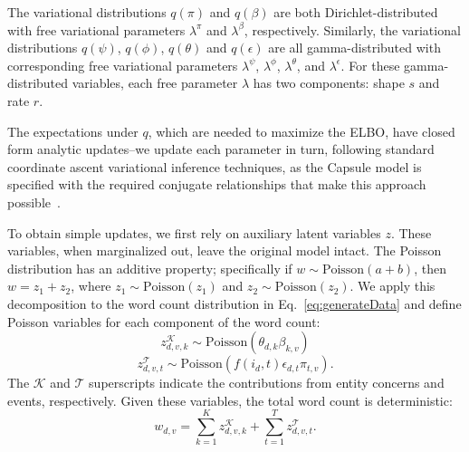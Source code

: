 The variational distributions $q(\pi)$ and $q(\beta)$ are both Dirichlet-distributed with free variational parameters $\lambda^\pi$ and $\lambda^\beta$, respectively.  Similarly, the variational distributions $q(\psi)$, $q(\phi)$, $q(\theta)$ and $q(\epsilon)$ are all gamma-distributed with corresponding free variational parameters $\lambda^\psi$, $\lambda^\phi$, $\lambda^\theta$, and $\lambda^\epsilon$.  For these gamma-distributed variables, each free parameter $\lambda$ has two components: shape $s$ and rate $r$.

The expectations under $q$, which are needed to maximize the ELBO, have closed form analytic updates--we update each parameter in turn, following standard coordinate ascent variational inference techniques, as the Capsule model is specified with the required conjugate relationships that make this approach possible~\cite{Ghahramani:2001}.

To obtain simple updates, we first rely on auxiliary latent variables $z$. These variables, when marginalized out, leave the original model intact. The Poisson distribution has an additive property; specifically if $w \sim \mbox{Poisson}(a+b)$, then $w = z_1 + z_2$, where $z_1 \sim \mbox{Poisson}(z_1)$ and $z_2 \sim \mbox{Poisson}(z_2)$.  We apply this decomposition to the word count distribution in Eq.~\ref{eq:generateData} and define Poisson variables for each component of the word count:
\[ z^\mathcal{K}_{d,v,k} \sim \mbox{Poisson}(\theta_{d,k}\beta_{k,v}) \]
\[ z^\mathcal{T}_{d,v,t} \sim \mbox{Poisson}\left(f(i_d, t) \epsilon_{d,t} \pi_{t,v}\right). \]
The $\mathcal{K}$ and $\mathcal{T}$ superscripts indicate the contributions from entity concerns and events, respectively.  Given these variables, the total word count is deterministic:
\[ w_{d,v} = \sum_{k=1}^K z^\mathcal{K}_{d,v,k} + \sum_{t=1}^T z^\mathcal{T}_{d,v,t}. \]

